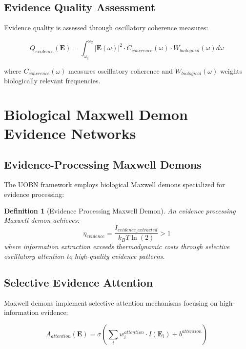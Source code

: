 \documentclass[12pt,a4paper]{article}
\newtheorem{definition}[theorem]{Definition}
\begin{document}
\subsection{Evidence Quality Assessment}

Evidence quality is assessed through oscillatory coherence measures:

\begin{equation}
Q_{evidence}(\mathbf{E}) = \int_{\omega_1}^{\omega_2} |\mathbf{E}(\omega)|^2 \cdot C_{coherence}(\omega) \cdot W_{biological}(\omega) d\omega
\end{equation}

where $C_{coherence}(\omega)$ measures oscillatory coherence and $W_{biological}(\omega)$ weights biologically relevant frequencies.

\section{Biological Maxwell Demon Evidence Networks}

\subsection{Evidence-Processing Maxwell Demons}

The UOBN framework employs biological Maxwell demons specialized for evidence processing:

\begin{definition}[Evidence Processing Maxwell Demon]
An evidence processing Maxwell demon achieves:
\begin{equation}
\eta_{evidence} = \frac{I_{evidence\_extracted}}{k_B T \ln(2)} > 1
\end{equation}
where information extraction exceeds thermodynamic costs through selective oscillatory attention to high-quality evidence patterns.
\end{definition}

\subsection{Selective Evidence Attention}

Maxwell demons implement selective attention mechanisms focusing on high-information evidence:

\begin{equation}
A_{attention}(\mathbf{E}) = \sigma\left(\sum_i w_i^{attention} \cdot I(\mathbf{E}_i) + b^{attention}\right)
\end{equation}
\end{document}
